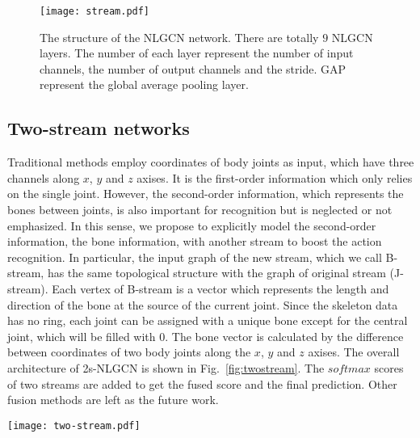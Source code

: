 \documentclass[10pt,twocolumn,letterpaper]{article}
\begin{document}
    \begin{figure}[!htb]
	\begin{center}
	\texttt{[image: stream.pdf]}
	\caption{The structure of the NLGCN network. There are totally $9$ NLGCN layers. The number of each layer represent the number of input channels, the number of output channels and the stride. GAP represent the global average pooling layer.}
	\label{fig:stream}	
	\end{center}
	\end{figure}
    
    \subsection{Two-stream networks}
    \label{tsn}
    Traditional methods employ coordinates of body joints as input, which have three channels along $x$, $y$ and $z$ axises. It is the first-order information which only relies on the single joint. However, the second-order information, which represents the bones between joints, is also important for recognition but is neglected or not emphasized. In this sense, we propose to explicitly model the second-order information, the bone information, with another stream to boost the action recognition. 
    In particular, the input graph of the new stream, which we call B-stream, has the same topological structure with the graph of original stream (J-stream). 
Each vertex of B-stream is a vector which represents the length and direction of the bone at the source of the current joint. 
    Since the skeleton data has no ring, each joint can be assigned with a unique bone except for the central joint, which will be filled with 0. The bone vector is calculated by the difference between coordinates of two body joints along the $x$, $y$ and $z$ axises.
    The overall architecture of 2s-NLGCN is shown in Fig.~\ref{fig:twostream}. The $softmax$ scores of two streams are added to get the fused score and the final prediction. Other fusion methods are left as the future work.
    
    \begin{figure*}[!htb]
	\begin{center}
	\texttt{[image: two-stream.pdf]}
	\caption{The overall architecture of 2s-NLGCN. The scores of two stream are added to get the final prediction.}
	\label{fig:twostream}	
	\end{center}
	\end{figure*}
\end{document}

